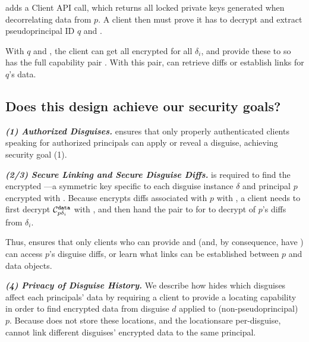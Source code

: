 \sys adds a  Client API call, which returns all locked private
keys  generated when decorrelating data from $p$.
A client then must prove it has  to decrypt  and extract pseudoprincipal ID $q$ and .

With $q$ and , the client can get all encrypted  for all $\delta_i$, and
provide these to \sys so \sys has the full capability pair . With
this pair, \sys can retrieve diffs or establish links for $q$'s data.


\subsection{Does this design achieve our security goals?}
\label{sec:achievegoals}
\vspace{6pt}\noindent\textbf{\emph{(1) Authorized Disguises.}}
\sys ensures that only properly authenticated clients speaking for authorized principals can apply or
reveal a disguise, achieving security goal (1).

\vspace{6pt}\noindent\textbf{\emph{(2/3) Secure Linking and Secure Disguise Diffs.}}
 is required to find the encrypted ---a symmetric key
specific to each disguise instance $\delta$ and principal $p$ encrypted with .
Because \sys encrypts  diffs associated with $p$ with , a client
needs to first decrypt $\mathcal{C}^{\texttt{data}}_{p\delta_i}$ with , and then hand the pair 
to \sys for \sys to decrypt of $p$'s diffs from $\delta_i$.

Thus, \sys ensures that only clients who can provide  and  (and,
by consequence, have ) can access $p$'s disguise diffs, or learn what links can be
established between $p$ and data objects.

\vspace{6pt}\noindent\textbf{\emph{(4) Privacy of Disguise History.}}
We describe how \sys hides which disguises affect each principals' data by requiring a client to
provide a locating capability  in order to find encrypted data from disguise $d$ applied
to (non-pseudoprincipal) $p$. Because \sys does not store these locations, and the locationsare per-disguise, \sys
cannot link different disguises' encrypted data to the same principal.

